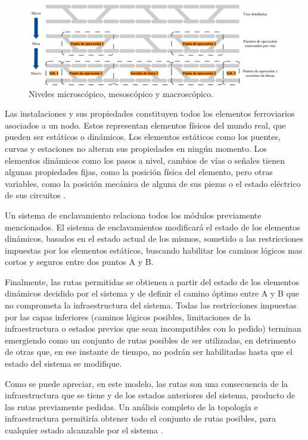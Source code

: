     \begin{figure}[H]
        \centering
        \includegraphics[width=1\textwidth]{Figuras/railtopomodel}
        \centering\caption{Niveles microscópico, mesoscópico y macroscópico.}
        \label{fig:RTM_2}
    \end{figure}
    
    Las instalaciones y sus propiedades constituyen todos los elementos ferroviarios asociados a un nodo. Estos representan elementos físicos del mundo real, que pueden ser estáticos o dinámicos. Los elementos estáticos como los puentes, curvas y estaciones no alteran sus propiedades en ningún momento. Los elementos dinámicos como los pasos a nivel, cambios de vías o señales tienen algunas propiedades fijas, como la posición física del elemento, pero otras variables, como la posición mecánica de alguna de sus piezas o el estado eléctrico de sus circuitos \cite{Paper_146,Paper_150}.

    Un sistema de enclavamiento relaciona todos los módulos previamente mencionados. El sistema de enclavamientos modificará el estado de los elementos dinámicos, basados en el estado actual de los mismos, sometido a las restricciones impuestas por los elementos estáticos, buscando habilitar los caminos lógicos mas cortos y seguros entre dos puntos A y B.

    Finalmente, las rutas permitidas se obtienen a partir del estado de los elementos dinámicos decidido por el sistema y de definir el camino óptimo entre A y B que no comprometa la infraestructura del sistema. Todas las restricciones impuestas por las capas inferiores (caminos lógicos posibles, limitaciones de la infraestructura o estados previos que sean incompatibles con lo pedido) terminan emergiendo como un conjunto de rutas posibles de ser utilizadas, en detrimento de otras que, en ese instante de tiempo, no podrán ser habilitadas hasta que el estado del sistema se modifique.

    Como se puede apreciar, en este modelo, las rutas son una consecuencia de la infraestructura que se tiene y de los estados anteriores del sistema, producto de las rutas previamente pedidas. Un análisis completo de la topología e infraestructura permitiría obtener todo el conjunto de rutas posibles, para cualquier estado alcanzable por el sistema \cite{Paper_150}.